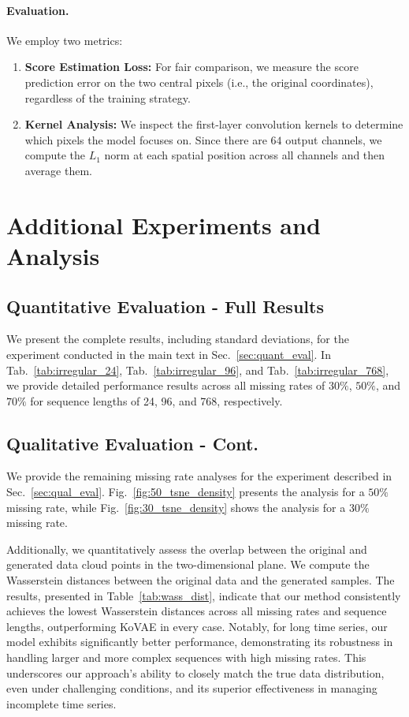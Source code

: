 \documentclass{article}
\theoremstyle{plain}
\theoremstyle{definition}
\theoremstyle{remark}
\begin{document}
{\paragraph{Evaluation.}
We employ two metrics:
\begin{enumerate}
    \item \textbf{Score Estimation Loss:} For fair comparison, we measure the score prediction error on the two central pixels (i.e., the original coordinates), regardless of the training strategy.
    \item \textbf{Kernel Analysis:} We inspect the first-layer convolution kernels to determine which pixels the model focuses on. Since there are $64$ output channels, we compute the $L_1$ norm at each spatial position across all channels and then average them.
\end{enumerate}
\noindent


\section{Additional Experiments and Analysis}

\subsection{Quantitative Evaluation - Full Results}
\label{sec:quant_eval_full}

We present the complete results, including standard deviations, for the experiment conducted in the main text in Sec.~\ref{sec:quant_eval}. In Tab.~\ref{tab:irregular_24}, Tab.~\ref{tab:irregular_96}, and Tab.~\ref{tab:irregular_768}, we provide detailed performance results across all missing rates of $30\%$, $50\%$, and $70\%$ for sequence lengths of 24, 96, and 768, respectively.


\subsection{Qualitative Evaluation - Cont.} 
\label{sec:qual_eval_full}
We provide the remaining missing rate analyses for the experiment described in Sec.~\ref{sec:qual_eval}. Fig.~\ref{fig:50_tsne_density} presents the analysis for a $50\%$ missing rate, while Fig.~\ref{fig:30_tsne_density} shows the analysis for a $30\%$ missing rate.

Additionally, we quantitatively assess the overlap between the original and generated data cloud points in the two-dimensional plane. We compute the Wasserstein distances between the original data and the generated samples. The results, presented in Table~\ref{tab:wass_dist}, indicate that our method consistently achieves the lowest Wasserstein distances across all missing rates and sequence lengths, outperforming KoVAE in every case. Notably, for long time series, our model exhibits significantly better performance, demonstrating its robustness in handling larger and more complex sequences with high missing rates. This underscores our approach's ability to closely match the true data distribution, even under challenging conditions, and its superior effectiveness in managing incomplete time series.





}
\end{document}
